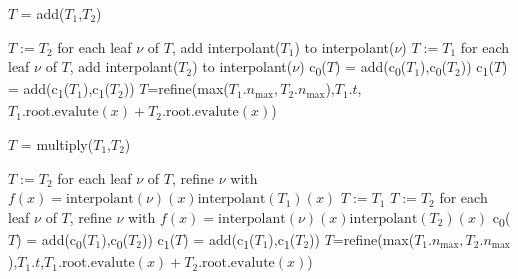 \documentclass{article}
\newcommand{\nmax}{n_{\text{max}}}
\newcommand{\child}[1]{c\textsubscript{#1}}
\begin{document}
\begin{algorithm}[!h]
\caption{$T$ = add($T_1$,$T_2$)}
\label{addition}
\begin{algorithmic}
\STATE $T:=T_2$
\STATE for each leaf $\nu$ of $T$, add interpolant($T_1$) to interpolant($\nu$)
\STATE $T:=T_1$
\STATE for each leaf $\nu$ of $T$, add interpolant($T_2$) to interpolant($\nu$)
\STATE \child{0}($T$) = add(\child{0}($T_1$),\child{0}($T_2$))
\STATE \child{1}($T$) = add(\child{1}($T_1$),\child{1}($T_2$))
\ELSE
\STATE $T$=refine(max($T_1.\nmax,T_2.\nmax$),$T_1.t$,$T_1.\text{root.evalute}(x)+T_2.\text{root.evalute}(x)$)
\ENDIF
\end{algorithmic}
\end{algorithm}

\begin{algorithm}[!h]
\caption{$T$ = multiply($T_1$,$T_2$)}
\label{multiply}
\begin{algorithmic}
\STATE $T:=T_2$
\STATE for each leaf $\nu$ of $T$, refine $\nu$ with $f(x)=\text{interpolant}(\nu)(x)\text{interpolant}(T_1)(x)$
\STATE $T:=T_1$
\STATE $T:=T_2$
\STATE for each leaf $\nu$ of $T$, refine $\nu$ with $f(x)=\text{interpolant}(\nu)(x)\text{interpolant}(T_2)(x)$
\STATE \child{0}($T$) = add(\child{0}($T_1$),\child{0}($T_2$))
\STATE \child{1}($T$) = add(\child{1}($T_1$),\child{1}($T_2$))
\ELSE
\STATE $T$=refine(max($T_1.\nmax,T_2.\nmax$),$T_1.t$,$T_1.\text{root.evalute}(x)+T_2.\text{root.evalute}(x)$)
\ENDIF
\end{algorithmic}
\end{algorithm}




\end{document}
